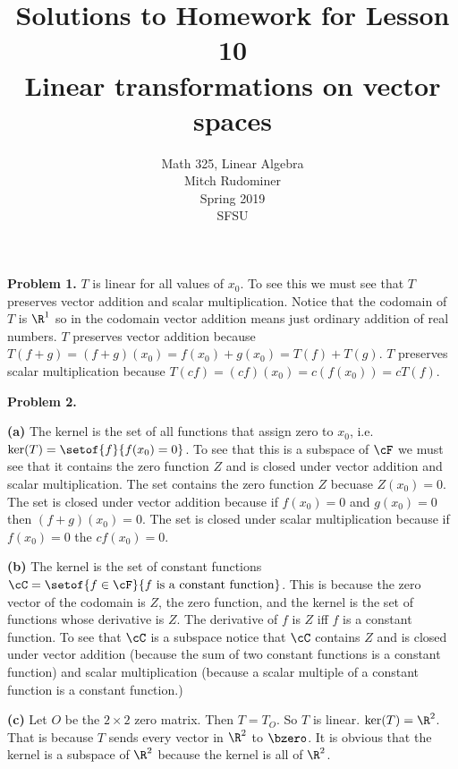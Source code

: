 \documentclass[oneside,12pt]{amsart}
\begin{document}
\title{Solutions to Homework for Lesson 10 \\ Linear transformations on vector spaces}
\author{Math 325, Linear Algebra \\ Mitch Rudominer \\ Spring 2019 \\ SFSU }
\date{}

\maketitle


\textbf{Problem 1.} $T$ is linear for all values of $x_0$. To see this we
must see that $T$ preserves vector addition and scalar multiplication.
Notice that the codomain of $T$ is $\R^1$ so in the codomain vector addition
means just ordinary addition of real numbers. $T$ preserves vector addition
because $T(f + g) = (f+g)(x_0) = f(x_0) + g(x_0) = T(f) + T(g)$.
$T$ preserves scalar multiplication because $T(cf) = (cf)(x_0)
= c(f(x_0)) = cT(f)$.

\bigskip

\textbf{Problem 2.}

\textbf{(a)} The kernel is the set of all functions that assign zero to $x_0$,
i.e. $\ker(T) = \setof{f}{f(x_0) = 0}$. To see that this is a subspace of $\cF$
we must see that it contains the zero function $Z$ and is closed under vector addition
and scalar multiplication. The set contains the zero function $Z$ becuase
$Z(x_0) = 0$. The set is closed under vector addition because if $f(x_0) = 0$
and $g(x_0) = 0$ then $(f+g)(x_0) = 0$. The set is closed under scalar
multiplication because if $f(x_0) = 0$ the $cf(x_0) = 0$.

\bigskip

\textbf{(b)} The kernel is the set of constant functions
$\cC = \setof{f\in\cF}{f \text{ is a constant function} }$. This is because
the zero vector of the codomain is $Z$, the zero function, and the kernel
is the set of functions whose derivative is $Z$. The derivative of $f$ is
$Z$ iff $f$ is a constant function. To see that $\cC$ is a subspace notice
that $\cC$ contains $Z$ and is closed under vector addition (because the sum of
two constant functions is a constant function) and scalar multiplication
(because a scalar multiple of a constant function is a constant function.)

\bigskip

\textbf{(c)} Let $O$ be the $2\times 2$ zero matrix. Then $T=T_O$. So $T$
is linear. $\ker(T) = \R^2$. That is because $T$ sends every vector in
$\R^2$ to $\bzero$. It is obvious that the kernel is a subspace of $\R^2$ because
the kernel is all of $\R^2$.
\end{document}
